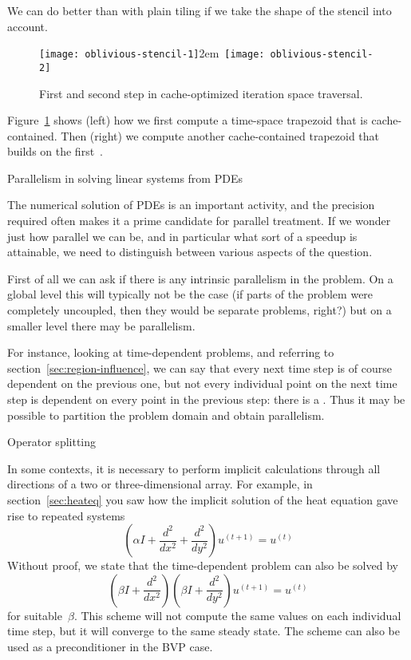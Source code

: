 We can do better than with plain tiling if we take the shape of the
stencil into account.
\begin{figure}[ht]
  \hbox{\texttt{[image: oblivious-stencil-1]}\kern2em\relax
    \texttt{[image: oblivious-stencil-2]}}
  \caption{First and second step in cache-optimized iteration space
    traversal.}
  \label{fig:oblivious-cache}
\end{figure}
Figure~\ref{fig:oblivious-cache} shows (left) how we first compute a
time-space trapezoid that is cache-contained. Then (right) we compute
another cache-contained trapezoid that builds on the
first~\cite{Frigo:2007:oblivious-stencil}.

 {Parallelism in solving linear systems from \acp{PDE}}

The numerical solution of \acp{PDE} is an important activity,
and the precision required often makes it a prime candidate for
parallel treatment. If we wonder just how parallel we can be,
and in particular what sort of a speedup is attainable,
we need to distinguish between various aspects of the question.

First of all we can ask if there is any intrinsic parallelism
in the problem. On a global level this will typically not be the case
(if parts of the problem were completely uncoupled, then they would be
separate problems, right?) but on a smaller level there may be
parallelism. 

For instance, looking at time-dependent problems, and referring to
section~\ref{sec:region-influence}, we can say that every next time
step is of course dependent on the previous one, but not every
individual point on the next time step is dependent on every point in
the previous step: there is a . 
Thus it may be possible to partition the problem domain and
obtain parallelism.

 {Operator splitting}

In some contexts, it is necessary to perform implicit calculations
through all directions of a two or three-dimensional array. For
example, in section~\ref{sec:heateq} you saw how the implicit solution
of the heat equation
gave rise to repeated systems
\begin{equation}
  (\alpha I+\frac {d^2}{dx^2}+\frac{d^2}{dy^2})u^{(t+1)}=u^{(t)}
  \label{eq:heat-recap}
\end{equation}
Without proof, we state that the time-dependent problem can also be solved by
\begin{equation}
  (\beta I+\frac {d^2}{dx^2})(\beta I+\frac{d^2}{dy^2})u^{(t+1)}=u^{(t)}
  \label{eq:adi-recap}
\end{equation}
for suitable~$\beta$. This scheme will not compute the same
values on each individual time step, but it will converge to the same
steady state. The scheme can also be used as a preconditioner in the
\ac{BVP} case.

